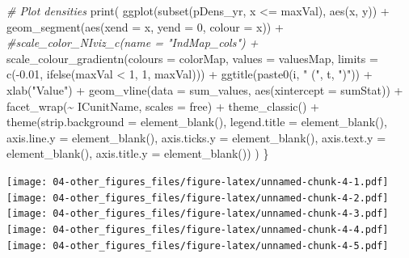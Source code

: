 \documentclass[
]{book}
\newenvironment{Shaded}{\begin{snugshade}}{\end{snugshade}}
\newcommand{\AttributeTok}[1]{\textcolor[rgb]{0.77,0.63,0.00}{#1}}
\newcommand{\CommentTok}[1]{\textcolor[rgb]{0.56,0.35,0.01}{\textit{#1}}}
\newcommand{\DecValTok}[1]{\textcolor[rgb]{0.00,0.00,0.81}{#1}}
\newcommand{\FloatTok}[1]{\textcolor[rgb]{0.00,0.00,0.81}{#1}}
\newcommand{\FunctionTok}[1]{\textcolor[rgb]{0.00,0.00,0.00}{#1}}
\newcommand{\NormalTok}[1]{#1}
\newcommand{\SpecialCharTok}[1]{\textcolor[rgb]{0.00,0.00,0.00}{#1}}
\newcommand{\StringTok}[1]{\textcolor[rgb]{0.31,0.60,0.02}{#1}}
\begin{document}
\begin{Shaded}
\begin{Highlighting}[]
  \CommentTok{\# Plot densities}
  \FunctionTok{print}\NormalTok{(}
    \FunctionTok{ggplot}\NormalTok{(}\FunctionTok{subset}\NormalTok{(pDens\_yr, x }\SpecialCharTok{\textless{}=}\NormalTok{ maxVal), }\FunctionTok{aes}\NormalTok{(x, y)) }\SpecialCharTok{+} 
      \FunctionTok{geom\_segment}\NormalTok{(}\FunctionTok{aes}\NormalTok{(}\AttributeTok{xend =}\NormalTok{ x, }\AttributeTok{yend =} \DecValTok{0}\NormalTok{, }\AttributeTok{colour =}\NormalTok{ x)) }\SpecialCharTok{+} 
      \CommentTok{\#scale\_color\_NIviz\_c(name = "IndMap\_cols") + }
      \FunctionTok{scale\_colour\_gradientn}\NormalTok{(}\AttributeTok{colours =}\NormalTok{ colorMap,}
                             \AttributeTok{values =}\NormalTok{ valuesMap,}
                             \AttributeTok{limits =} \FunctionTok{c}\NormalTok{(}\SpecialCharTok{{-}}\FloatTok{0.01}\NormalTok{, }\FunctionTok{ifelse}\NormalTok{(maxVal }\SpecialCharTok{\textless{}} \DecValTok{1}\NormalTok{, }\DecValTok{1}\NormalTok{, maxVal))) }\SpecialCharTok{+}
      \FunctionTok{ggtitle}\NormalTok{(}\FunctionTok{paste0}\NormalTok{(i, }\StringTok{" ("}\NormalTok{, t, }\StringTok{")"}\NormalTok{)) }\SpecialCharTok{+}
      \FunctionTok{xlab}\NormalTok{(}\StringTok{"Value"}\NormalTok{) }\SpecialCharTok{+} 
      \FunctionTok{geom\_vline}\NormalTok{(}\AttributeTok{data =}\NormalTok{ sum\_values, }\FunctionTok{aes}\NormalTok{(}\AttributeTok{xintercept =}\NormalTok{ sumStat)) }\SpecialCharTok{+} 
      \FunctionTok{facet\_wrap}\NormalTok{(}\SpecialCharTok{\textasciitilde{}}\NormalTok{ ICunitName, }\AttributeTok{scales =} \StringTok{\textquotesingle{}free\textquotesingle{}}\NormalTok{) }\SpecialCharTok{+} 
      \FunctionTok{theme\_classic}\NormalTok{() }\SpecialCharTok{+} 
      \FunctionTok{theme}\NormalTok{(}\AttributeTok{strip.background =} \FunctionTok{element\_blank}\NormalTok{(), }
            \AttributeTok{legend.title =} \FunctionTok{element\_blank}\NormalTok{(),}
            \AttributeTok{axis.line.y =} \FunctionTok{element\_blank}\NormalTok{(), }\AttributeTok{axis.ticks.y =} \FunctionTok{element\_blank}\NormalTok{(),}
            \AttributeTok{axis.text.y =} \FunctionTok{element\_blank}\NormalTok{(), }\AttributeTok{axis.title.y =} \FunctionTok{element\_blank}\NormalTok{())}
\NormalTok{  )}
\NormalTok{\}}
\end{Highlighting}
\end{Shaded}

\texttt{[image: 04-other\_figures\_files/figure-latex/unnamed-chunk-4-1.pdf]} \texttt{[image: 04-other\_figures\_files/figure-latex/unnamed-chunk-4-2.pdf]} \texttt{[image: 04-other\_figures\_files/figure-latex/unnamed-chunk-4-3.pdf]} \texttt{[image: 04-other\_figures\_files/figure-latex/unnamed-chunk-4-4.pdf]} \texttt{[image: 04-other\_figures\_files/figure-latex/unnamed-chunk-4-5.pdf]}
\end{document}
